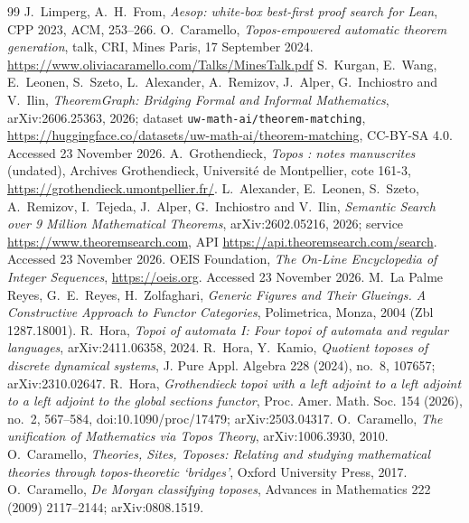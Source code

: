 \begin{thebibliography}{99}
 J.~Limperg, A.~H.~From, \emph{Aesop: white-box best-first proof search for Lean}, CPP 2023, ACM, 253--266.
 O.~Caramello, \emph{Topos-empowered automatic theorem generation}, talk, CRI, Mines Paris, 17 September 2024. \url{https://www.oliviacaramello.com/Talks/MinesTalk.pdf}
 S.~Kurgan, E.~Wang, E.~Leonen, S.~Szeto, L.~Alexander, A.~Remizov, J.~Alper, G.~Inchiostro and V.~Ilin, \emph{TheoremGraph: Bridging Formal and Informal Mathematics}, arXiv:2606.25363, 2026; dataset \texttt{uw-math-ai/theorem-matching}, \url{https://huggingface.co/datasets/uw-math-ai/theorem-matching}, CC-BY-SA 4.0. Accessed 23 November 2026.
 A.~Grothendieck, \emph{Topos : notes manuscrites} (undated), Archives Grothendieck, Université de Montpellier, cote 161-3, \url{https://grothendieck.umontpellier.fr/}.
 L.~Alexander, E.~Leonen, S.~Szeto, A.~Remizov, I.~Tejeda, J.~Alper, G.~Inchiostro and V.~Ilin, \emph{Semantic Search over 9 Million Mathematical Theorems}, arXiv:2602.05216, 2026; service \url{https://www.theoremsearch.com}, API \url{https://api.theoremsearch.com/search}. Accessed 23 November 2026.
 OEIS Foundation, \emph{The On-Line Encyclopedia of Integer Sequences}, \url{https://oeis.org}. Accessed 23 November 2026.
 M.~La Palme Reyes, G.~E.~Reyes, H.~Zolfaghari, \emph{Generic Figures and Their Glueings. A Constructive Approach to Functor Categories}, Polimetrica, Monza, 2004 (Zbl 1287.18001).
 R.~Hora, \emph{Topoi of automata I: Four topoi of automata and regular languages}, arXiv:2411.06358, 2024.
 R.~Hora, Y.~Kamio, \emph{Quotient toposes of discrete dynamical systems}, J. Pure Appl. Algebra 228 (2024), no.~8, 107657; arXiv:2310.02647.
 R.~Hora, \emph{Grothendieck topoi with a left adjoint to a left adjoint to a left adjoint to the global sections functor}, Proc. Amer. Math. Soc. 154 (2026), no.~2, 567--584, doi:10.1090/proc/17479; arXiv:2503.04317.
 O.~Caramello, \emph{The unification of Mathematics via Topos Theory}, arXiv:1006.3930, 2010.
 O.~Caramello, \emph{Theories, Sites, Toposes: Relating and studying mathematical theories through topos-theoretic `bridges'}, Oxford University Press, 2017.
 O.~Caramello, \emph{De Morgan classifying toposes}, Advances in Mathematics 222 (2009) 2117--2144; arXiv:0808.1519.

\end{thebibliography}
